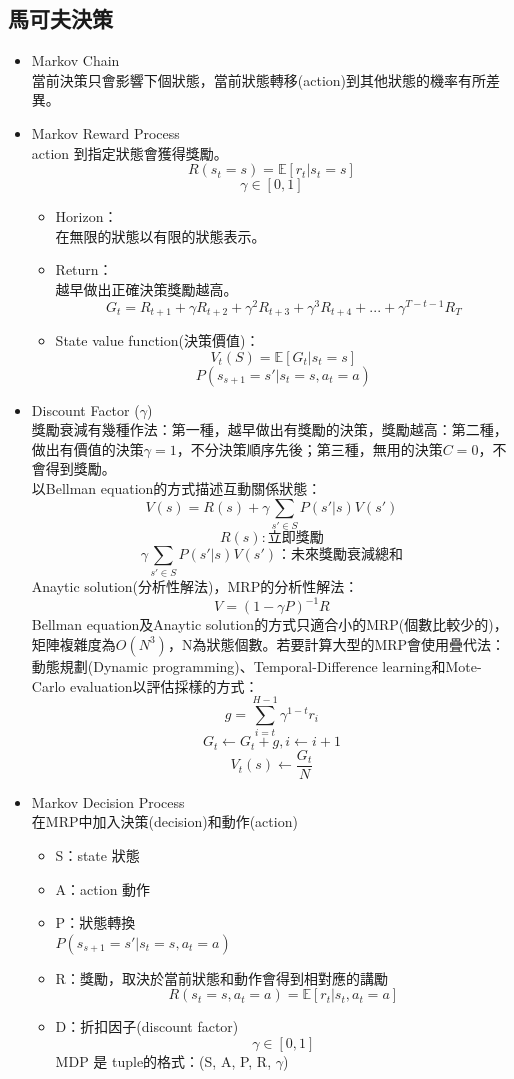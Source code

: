 \documentclass[14pt,a4paper]{report}  %
\begin{document}
\subsection{馬可夫決策}
\begin{itemize}
\item Markov Chain\\
當前決策只會影響下個狀態，當前狀態轉移(action)到其他狀態的機率有所差異。
\item Markov Reward Process\\
action 到指定狀態會獲得獎勵。
$$R(s_t=s) = \mathbb{E}[r_t|s_t = s]$$
$$\gamma \in [0, 1]$$
\begin{itemize}
\item Horizon：\\
在無限的狀態以有限的狀態表示。\\
\item Return：\\
越早做出正確決策獎勵越高。\\
$$G_t = R_{t+1}+\gamma R_{t+2}+\gamma^2 R_{t+3}+\gamma^3 R_{t+4}+...+\gamma^{T-t-1} R_{T}$$
\item State value function(決策價值)：\\
$$V_t(S) = \mathbb{E}[G_t|s_t = s]$$
$$P(s_{s+1}=s'|s_t=s,a_t=a)$$
\end{itemize}
\item Discount Factor ($\gamma$)\\
獎勵衰減有幾種作法：第一種，越早做出有獎勵的決策，獎勵越高：第二種，做出有價值的決策$\gamma = 1$，不分決策順序先後；第三種，無用的決策$C = 0$，不會得到獎勵。\\
以Bellman equation的方式描述互動關係狀態：\\
$$V(s) = R(s)+\gamma\sum_{s'\in S}P(s'|s)V(s')$$
$$R(s):立即獎勵$$
$$\gamma\sum_{s'\in S}P(s'|s)V(s')：未來獎勵衰減總和$$
Anaytic solution(分析性解法)，MRP的分析性解法：\\
$$V = (1-\gamma P)^{-1}R$$
Bellman equation及Anaytic solution的方式只適合小的MRP(個數比較少的)，矩陣複雜度為$O(N^3)$，N為狀態個數。若要計算大型的MRP會使用疊代法：動態規劃(Dynamic programming)、Temporal-Difference learning和Mote-Carlo evaluation以評估採樣的方式：
$$g = \sum_{i=t}^{H-1}\gamma^{1-t}r_i$$
$$G_t \leftarrow G_t+g,  i \leftarrow i+1$$
$$V_t(s) \leftarrow \frac{G_t}{N}$$
\item Markov Decision Process\\
\quad 在MRP中加入決策(decision)和動作(action)\\
\begin{itemize}
\item S：state 狀態
\item A：action 動作
\item P：狀態轉換\\[6pt]
$P(s_{s+1}=s'|s_t=s,a_t=a)$
\item R：獎勵，取決於當前狀態和動作會得到相對應的講勵
$$R(s_t=s, a_t=a) = \mathbb{E}[r_t|s_t, a_t=a]$$
\item D：折扣因子(discount factor)
$$\gamma \in [0,1]$$
MDP 是 tuple的格式：(S, A, P, R, $\gamma$)
\end{itemize}


\end{itemize}
\end{document}
